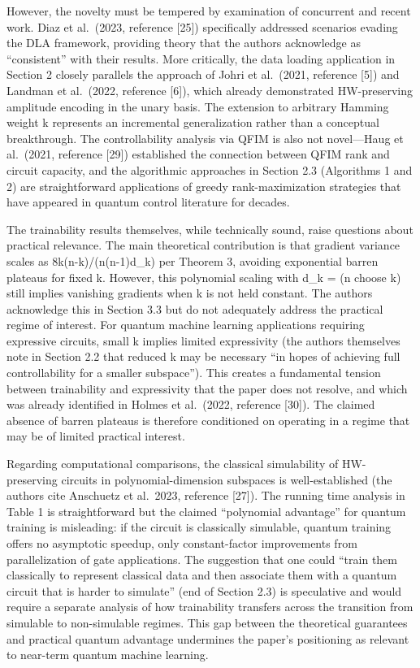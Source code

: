 \documentclass[10pt,letterpaper]{article}
\begin{document}
However, the novelty must be tempered by examination of concurrent and recent work. Diaz et al.~(2023, reference {[}25{]}) specifically addressed scenarios evading the DLA framework, providing theory that the authors acknowledge as ``consistent'' with their results. More critically, the data loading application in Section 2 closely parallels the approach of Johri et al.~(2021, reference {[}5{]}) and Landman et al.~(2022, reference {[}6{]}), which already demonstrated HW-preserving amplitude encoding in the unary basis. The extension to arbitrary Hamming weight k represents an incremental generalization rather than a conceptual breakthrough. The controllability analysis via QFIM is also not novel---Haug et al.~(2021, reference {[}29{]}) established the connection between QFIM rank and circuit capacity, and the algorithmic approaches in Section 2.3 (Algorithms 1 and 2) are straightforward applications of greedy rank-maximization strategies that have appeared in quantum control literature for decades.

The trainability results themselves, while technically sound, raise questions about practical relevance. The main theoretical contribution is that gradient variance scales as 8k(n-k)/(n(n-1)d\_k) per Theorem 3, avoiding exponential barren plateaus for fixed k. However, this polynomial scaling with d\_k = (n choose k) still implies vanishing gradients when k is not held constant. The authors acknowledge this in Section 3.3 but do not adequately address the practical regime of interest. For quantum machine learning applications requiring expressive circuits, small k implies limited expressivity (the authors themselves note in Section 2.2 that reduced k may be necessary ``in hopes of achieving full controllability for a smaller subspace''). This creates a fundamental tension between trainability and expressivity that the paper does not resolve, and which was already identified in Holmes et al.~(2022, reference {[}30{]}). The claimed absence of barren plateaus is therefore conditioned on operating in a regime that may be of limited practical interest.

Regarding computational comparisons, the classical simulability of HW-preserving circuits in polynomial-dimension subspaces is well-established (the authors cite Anschuetz et al.~2023, reference {[}27{]}). The running time analysis in Table 1 is straightforward but the claimed ``polynomial advantage'' for quantum training is misleading: if the circuit is classically simulable, quantum training offers no asymptotic speedup, only constant-factor improvements from parallelization of gate applications. The suggestion that one could ``train them classically to represent classical data and then associate them with a quantum circuit that is harder to simulate'' (end of Section 2.3) is speculative and would require a separate analysis of how trainability transfers across the transition from simulable to non-simulable regimes. This gap between the theoretical guarantees and practical quantum advantage undermines the paper's positioning as relevant to near-term quantum machine learning.
\end{document}
